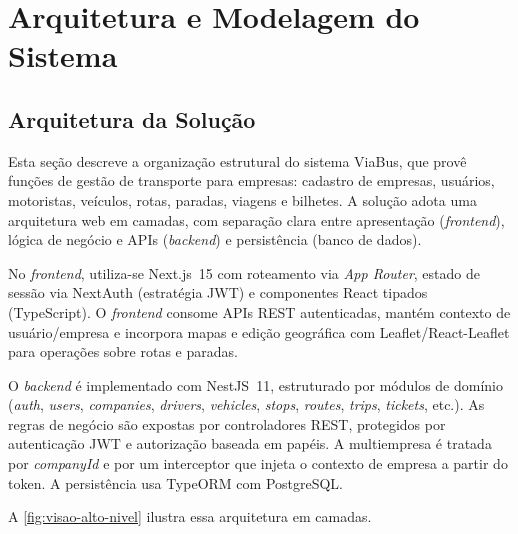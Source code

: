 \chapter{Arquitetura e Modelagem do Sistema} \label{cha:arquitetura}

\section{Arquitetura da Solução}
Esta seção descreve a organização estrutural do sistema ViaBus, que provê funções de gestão de transporte para empresas: cadastro de empresas, usuários, motoristas, veículos, rotas, paradas, viagens e bilhetes. A solução adota uma arquitetura web em camadas, com separação clara entre apresentação (\textit{frontend}), lógica de negócio e APIs (\textit{backend}) e persistência (banco de dados).

No \textit{frontend}, utiliza-se Next.js~15 com roteamento via \textit{App Router}, estado de sessão via NextAuth (estratégia JWT) e componentes React tipados (TypeScript). O \textit{frontend} consome APIs REST autenticadas, mantém contexto de usuário/empresa e incorpora mapas e edição geográfica com Leaflet/React-Leaflet para operações sobre rotas e paradas.

O \textit{backend} é implementado com NestJS~11, estruturado por módulos de domínio (\textit{auth}, \textit{users}, \textit{companies}, \textit{drivers}, \textit{vehicles}, \textit{stops}, \textit{routes}, \textit{trips}, \textit{tickets}, etc.). As regras de negócio são expostas por controladores REST, protegidos por autenticação JWT e autorização baseada em papéis. A multiempresa é tratada por \textit{companyId} e por um interceptor que injeta o contexto de empresa a partir do token. A persistência usa TypeORM com PostgreSQL.
 
A \autoref{fig:visao-alto-nivel} ilustra essa arquitetura em camadas.

